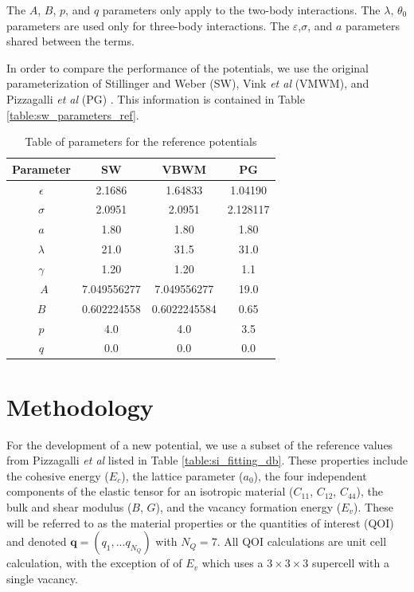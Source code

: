 The $A$, $B$, $p$, and $q$ parameters only apply to the two-body interactions.
The $\lambda$, $\theta_0$ parameters are used only for three-body interactions.
The $\varepsilon$,$\sigma$, and $a$ parameters shared between the terms.

In order to compare the performance of the potentials, we use the original parameterization of Stillinger and Weber (SW)\cite{stillinger1985_sw}, Vink \emph{et al} (VMWM)\cite{vink2001_sw_Si}, and Pizzagalli \emph{et al} (PG) \cite{pizzagalli2013_sw_Si}.  This information is contained in Table \ref{table:sw_parameters_ref}.

\begin{table}[ht]
	\centering
	\caption{Table of parameters for the reference potentials}
	\label{tbl:sw_parameters_ref}
	\begin{tabular}{c c c c}
		\hline
		Parameter & SW & VBWM & PG \\
		\hline
		$\epsilon$ & 2.1686 & 1.64833 & 1.04190 \\
		$\sigma$ &   2.0951 & 2.0951 & 2.128117 \\
		$a$ &       1.80 & 1.80 & 1.80 \\
		$\lambda$ & 21.0 & 31.5 & 31.0 \\
		$\gamma$ & 1.20 & 1.20 & 1.1 \\\
		$A$ & 7.049556277 & 7.049556277 & 19.0 \\
		$B$ & 0.602224558 & 0.6022245584 & 0.65 \\
		$p$ & 4.0 & 4.0 & 3.5 \\
		$q$ & 0.0 & 0.0 & 0.0 \\
		\hline
	\end{tabular}
\end{table}

\section{Methodology}

For the development of a new potential, we use a subset of the reference values from Pizzagalli \emph{et al} \cite{pizzagalli2013_sw_Si} listed in Table \ref{table:si_fitting_db}.  These properties include the cohesive energy ($E_c$), the lattice parameter ($a_0$), the four independent components of the elastic tensor for an isotropic material ($C_{11}$, $C_{12}$, $C_{44}$), the bulk and shear modulus ($B$, $G$), and the vacancy formation energy ($E_v$).
These will be referred to as the material properties or the quantities of interest (QOI) and denoted $\bm{q}=(q_1,...q_{N_Q})$ with $N_Q = 7$.
All QOI calculations are unit cell calculation, with the exception of of $E_v$ which uses a $3 \times 3 \times 3$ supercell with a single vacancy.


